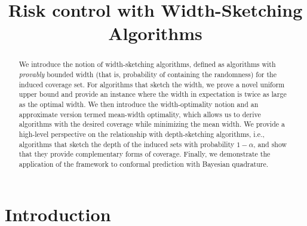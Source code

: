 \documentclass{article} %
\title{Risk control with Width-Sketching Algorithms}
\theoremstyle{remark}
\theoremstyle{definition}      %
\begin{document}
\maketitle

\begin{abstract}
  We introduce the notion of width-sketching algorithms, defined as algorithms with \emph{provably} bounded width (that is, probability of containing the randomness) for the induced coverage set. For algorithms that sketch the width, we prove a novel uniform upper bound and provide an instance where the width in expectation is twice as large as the optimal width. We then introduce the width-optimality notion and an approximate version termed mean-width optimality, which allows us to derive algorithms with the desired coverage while minimizing the mean width. We provide a high-level perspective on the relationship with depth-sketching algorithms, i.e., algorithms that sketch the depth of the induced sets with probability $1- \alpha$, and show that they provide complementary forms of coverage. Finally, we demonstrate the application of the framework to conformal prediction with Bayesian quadrature.
\end{abstract}

\section{Introduction}
\end{document}
